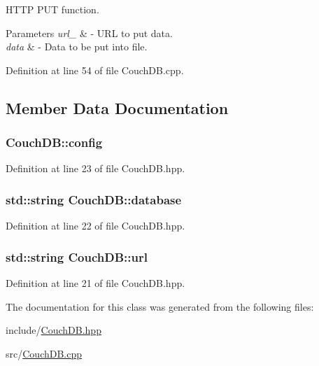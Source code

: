 H\+T\+TP P\+UT function. 


\begin{DoxyParams}{Parameters}
{\em url\+\_\+} & -\/ U\+RL to put data. \\
\hline
{\em data} & -\/ Data to be put into file. \\
\hline
\end{DoxyParams}


Definition at line 54 of file Couch\+D\+B.\+cpp.



\subsection{Member Data Documentation}
\subsubsection[{\texorpdfstring{config}{config}}]{ Couch\+D\+B\+::config\hspace{0.3cm}{\ttfamily [protected]}}\hypertarget{class_couch_d_b_ada3dd3c5112ccf493eafe278ce4a521c}{}\label{class_couch_d_b_ada3dd3c5112ccf493eafe278ce4a521c}


Definition at line 23 of file Couch\+D\+B.\+hpp.

\subsubsection[{\texorpdfstring{database}{database}}]{\setlength{\rightskip}{0pt plus 5cm}std\+::string Couch\+D\+B\+::database\hspace{0.3cm}{\ttfamily [protected]}}\hypertarget{class_couch_d_b_a5951cb721e50d0b8d24c8fea625909ff}{}\label{class_couch_d_b_a5951cb721e50d0b8d24c8fea625909ff}


Definition at line 22 of file Couch\+D\+B.\+hpp.

\subsubsection[{\texorpdfstring{url}{url}}]{\setlength{\rightskip}{0pt plus 5cm}std\+::string Couch\+D\+B\+::url\hspace{0.3cm}{\ttfamily [protected]}}\hypertarget{class_couch_d_b_a1282b49d828b838b8007bbb08ba77a69}{}\label{class_couch_d_b_a1282b49d828b838b8007bbb08ba77a69}


Definition at line 21 of file Couch\+D\+B.\+hpp.



The documentation for this class was generated from the following files\+:\begin{DoxyCompactItemize}
\item 
include/\hyperlink{_couch_d_b_8hpp}{Couch\+D\+B.\+hpp}\item 
src/\hyperlink{_couch_d_b_8cpp}{Couch\+D\+B.\+cpp}\end{DoxyCompactItemize}
